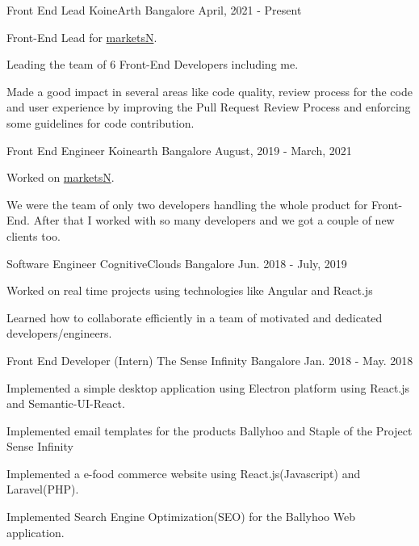 \begin{cventries}
  \cventry
    {Front End Lead}
    {KoineArth}
    {Bangalore}
    {April, 2021 - Present}
    {
      \begin{cvitems}
        \item{Front-End Lead for \href{https://marketsn.com/}{marketsN}.}
        \item{Leading the team of 6 Front-End Developers including me.}
        \item{Made a good impact in several areas like code quality, review process for the code and user experience by improving the Pull Request Review Process and enforcing some guidelines for code contribution.}
      \end{cvitems}
    }
  \cventry
    {Front End Engineer}
    {Koinearth}
    {Bangalore}
    {August, 2019 - March, 2021}
    {
        \begin{cvitems}
            \item{Worked on \href{https://marketsn.com/}{marketsN}.}
            \item{We were the team of only two developers handling the whole product for Front-End. After that I worked with so many developers and we got a couple of new clients too.}
        \end{cvitems}
  }
  \cventry
    {Software Engineer}
    {CognitiveClouds}
    {Bangalore}
    {Jun. 2018 - July, 2019}
    {
      \begin{cvitems}
        \item{Worked on real time projects using technologies like Angular and React.js}
        \item{Learned how to collaborate efficiently in a team of motivated and dedicated developers/engineers.}
      \end{cvitems}
    }
  \cventry
    {Front End Developer (Intern)}
    {The Sense Infinity}
    {Bangalore}
    {Jan. 2018 - May. 2018}
    {
      \begin{cvitems}
        \item{ Implemented a simple desktop application using Electron platform using React.js and Semantic-UI-React.}
        \item {Implemented email templates for the products Ballyhoo and Staple of the Project Sense Infinity}
        \item {Implemented a e-food commerce website using React.js(Javascript) and Laravel(PHP).}
        \item {Implemented Search Engine Optimization(SEO) for the Ballyhoo Web application.}

\end{cvitems}}
\end{cventries}
